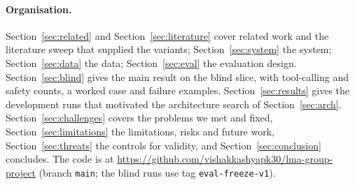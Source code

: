 \paragraph{Organisation.} Section~\ref{sec:related} and Section~\ref{sec:literature} cover related work and the literature sweep that supplied the variants; Section~\ref{sec:system} the system; Section~\ref{sec:data} the data; Section~\ref{sec:eval} the evaluation design. Section~\ref{sec:blind} gives the main result on the blind slice, with tool-calling and safety counts, a worked case and failure examples. Section~\ref{sec:results} gives the development runs that motivated the architecture search of Section~\ref{sec:arch}. Section~\ref{sec:challenges} covers the problems we met and fixed, Section~\ref{sec:limitations} the limitations, risks and future work, Section~\ref{sec:threats} the controls for validity, and Section~\ref{sec:conclusion} concludes. The code is at \url{https://github.com/vishakkashyapk30/lma-group-project} (branch \texttt{main}; the blind runs use tag \texttt{eval-freeze-v1}).
